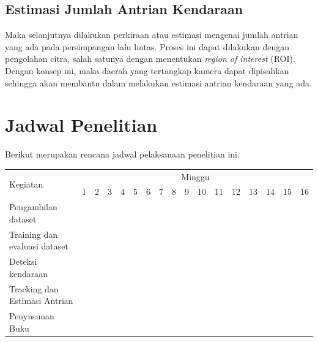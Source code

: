 \subsection{Estimasi Jumlah Antrian Kendaraan}
Maka selanjutnya dilakukan perkiraan atau estimasi mengenai jumlah antrian yang ada pada persimpangan lalu lintas. Proses ini dapat dilakukan dengan pengolahan citra, salah satunya dengan menentukan \emph{region of interest} (ROI). Dengan konsep ini, maka daerah yang tertangkap kamera dapat dipisahkan sehingga akan membantu dalam melakukan estimasi antrian kendaraan yang ada.

\section{Jadwal Penelitian}
Berikut merupakan rencana jadwal pelaksanaan penelitian ini.

\newcommand{\w}{}
\newcommand{\G}{\cellcolor{gray}}
\begin{table}[H]
  \label{tbl:timeline}
  \begin{tabular}{|p{3.5cm}|c|c|c|c|c|c|c|c|c|c|c|c|c|c|c|c|}

    \hline
    \multirow{2}{*}{Kegiatan} & \multicolumn{16}{|c|}{Minggu}                                                                       \\
    \cline{2-17}              &
    1                         & 2                             & 3  & 4  & 5  & 6  & 7  & 8  & 9  & 10 & 11 & 12 & 13 & 14 & 15 & 16 \\
    \hline

    Pengambilan dataset          &
    \G                        & \G                            & \G & \w & \w & \w & \w & \w & \w & \w & \w & \w & \w & \w & \w & \w \\
    \hline

    Training dan evaluasi dataset &
    \w                        & \w                            & \w & \G & \G & \G & \G & \w & \w & \w & \w & \w & \w & \w & \w & \w \\
    \hline

    Deteksi kendaraan         &
    \w                        & \w                            & \w & \w & \w & \w & \G & \G & \G & \w & \w & \w & \w & \w & \w & \w \\
    \hline

    Tracking dan Estimasi Antrian &
    \w                        & \w                            & \w & \w & \w & \w & \w & \w & \w & \G & \G & \G & \G & \G & \w & \w \\
    \hline

    Penyusunan Buku           &
    \w                        & \w                            & \w & \w & \w & \w & \w & \w & \w & \w & \w & \w & \w & \w & \G & \G \\
    \hline
  \end{tabular}
\end{table}


